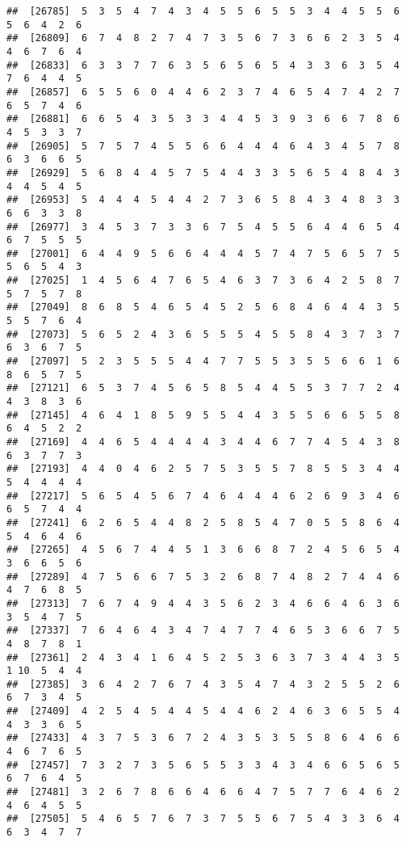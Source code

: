 \documentclass[
]{book}
\begin{document}
\begin{verbatim}
##  [26785]  5  3  5  4  7  4  3  4  5  5  6  5  5  3  4  4  5  5  6  5  6  4  2  6
##  [26809]  6  7  4  8  2  7  4  7  3  5  6  7  3  6  6  2  3  5  4  4  6  7  6  4
##  [26833]  6  3  3  7  7  6  3  5  6  5  6  5  4  3  3  6  3  5  4  7  6  4  4  5
##  [26857]  6  5  5  6  0  4  4  6  2  3  7  4  6  5  4  7  4  2  7  6  5  7  4  6
##  [26881]  6  6  5  4  3  5  3  3  4  4  5  3  9  3  6  6  7  8  6  4  5  3  3  7
##  [26905]  5  7  5  7  4  5  5  6  6  4  4  4  6  4  3  4  5  7  8  6  3  6  6  5
##  [26929]  5  6  8  4  4  5  7  5  4  4  3  3  5  6  5  4  8  4  3  4  4  5  4  5
##  [26953]  5  4  4  4  5  4  4  2  7  3  6  5  8  4  3  4  8  3  3  6  6  3  3  8
##  [26977]  3  4  5  3  7  3  3  6  7  5  4  5  5  6  4  4  6  5  4  6  7  5  5  5
##  [27001]  6  4  4  9  5  6  6  4  4  4  5  7  4  7  5  6  5  7  5  5  6  5  4  3
##  [27025]  1  4  5  6  4  7  6  5  4  6  3  7  3  6  4  2  5  8  7  5  7  5  7  8
##  [27049]  8  6  8  5  4  6  5  4  5  2  5  6  8  4  6  4  4  3  5  5  5  7  6  4
##  [27073]  5  6  5  2  4  3  6  5  5  5  4  5  5  8  4  3  7  3  7  6  3  6  7  5
##  [27097]  5  2  3  5  5  5  4  4  7  7  5  5  3  5  5  6  6  1  6  8  6  5  7  5
##  [27121]  6  5  3  7  4  5  6  5  8  5  4  4  5  5  3  7  7  2  4  4  3  8  3  6
##  [27145]  4  6  4  1  8  5  9  5  5  4  4  3  5  5  6  6  5  5  8  6  4  5  2  2
##  [27169]  4  4  6  5  4  4  4  4  3  4  4  6  7  7  4  5  4  3  8  6  3  7  7  3
##  [27193]  4  4  0  4  6  2  5  7  5  3  5  5  7  8  5  5  3  4  4  5  4  4  4  4
##  [27217]  5  6  5  4  5  6  7  4  6  4  4  4  6  2  6  9  3  4  6  6  5  7  4  4
##  [27241]  6  2  6  5  4  4  8  2  5  8  5  4  7  0  5  5  8  6  4  5  4  6  4  6
##  [27265]  4  5  6  7  4  4  5  1  3  6  6  8  7  2  4  5  6  5  4  3  6  6  5  6
##  [27289]  4  7  5  6  6  7  5  3  2  6  8  7  4  8  2  7  4  4  6  4  7  6  8  5
##  [27313]  7  6  7  4  9  4  4  3  5  6  2  3  4  6  6  4  6  3  6  3  5  4  7  5
##  [27337]  7  6  4  6  4  3  4  7  4  7  7  4  6  5  3  6  6  7  5  4  8  7  8  1
##  [27361]  2  4  3  4  1  6  4  5  2  5  3  6  3  7  3  4  4  3  5  1 10  5  4  4
##  [27385]  3  6  4  2  7  6  7  4  3  5  4  7  4  3  2  5  5  2  6  6  7  3  4  5
##  [27409]  4  2  5  4  5  4  4  5  4  4  6  2  4  6  3  6  5  5  4  4  3  3  6  5
##  [27433]  4  3  7  5  3  6  7  2  4  3  5  3  5  5  8  6  4  6  6  4  6  7  6  5
##  [27457]  7  3  2  7  3  5  6  5  5  3  3  4  3  4  6  6  5  6  5  6  7  6  4  5
##  [27481]  3  2  6  7  8  6  6  4  6  6  4  7  5  7  7  6  4  6  2  4  6  4  5  5
##  [27505]  5  4  6  5  7  6  7  3  7  5  5  6  7  5  4  3  3  6  4  6  3  4  7  7

\end{verbatim}
\end{document}
